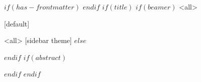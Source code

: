 $if(has-frontmatter)$
\frontmatter
$endif$
$if(title)$
$if(beamer)$
\mode<all>{
[default]
\begin{frame}
    \maketitle
\end{frame}
}
\mode<all>{
[sidebar theme]
}
$else$
\maketitle
$endif$
$if(abstract)$
\begin{abstract}
$abstract$
\end{abstract}
$endif$
$endif$